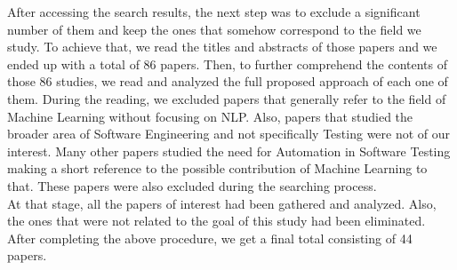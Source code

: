 After accessing the search results, the next step was to exclude a significant number of them and keep the ones that somehow correspond to the field we study. 
To achieve that, we read the titles and abstracts of those papers and we ended up with a total of 86 papers. Then, to further comprehend the contents of those 86 studies, 
we read and analyzed the full proposed approach of each one of them. During the reading, we excluded papers that generally refer to the field of 
Machine Learning without focusing on NLP. Also, papers that studied the broader area of Software Engineering and not specifically Testing were not 
of our interest. Many other papers studied the need for Automation in Software Testing making a short reference to the possible contribution of Machine 
Learning to that. These papers were also excluded during the searching process. \\

At that stage, all the papers of interest had been gathered and analyzed. Also, the ones that were not related to the goal of this study had been 
eliminated. After completing the above procedure, we get a final total consisting of 44 papers. 